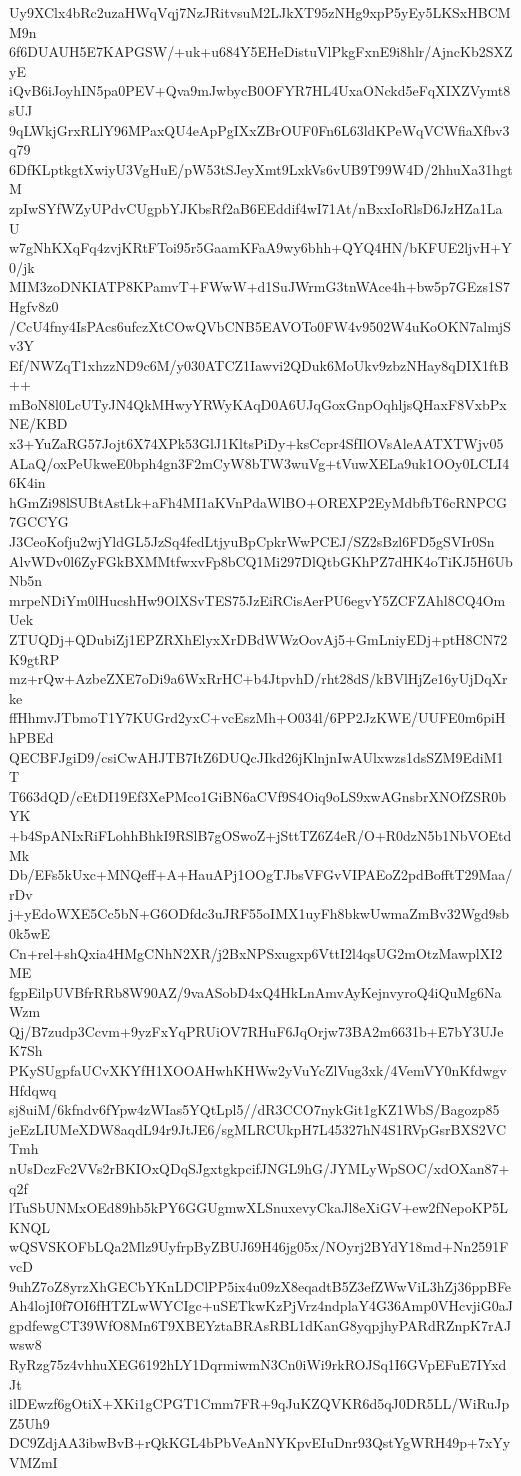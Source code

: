 Uy9XClx4bRc2uzaHWqVqj7NzJRitvsuM2LJkXT95zNHg9xpP5yEy5LKSxHBCMM9n
6f6DUAUH5E7KAPGSW/+uk+u684Y5EHeDistuVlPkgFxnE9i8hlr/AjncKb2SXZyE
iQvB6iJoyhIN5pa0PEV+Qva9mJwbycB0OFYR7HL4UxaONckd5eFqXIXZVymt8sUJ
9qLWkjGrxRLlY96MPaxQU4eApPgIXxZBrOUF0Fn6L63ldKPeWqVCWfiaXfbv3q79
6DfKLptkgtXwiyU3VgHuE/pW53tSJeyXmt9LxkVs6vUB9T99W4D/2hhuXa31hgtM
zpIwSYfWZyUPdvCUgpbYJKbsRf2aB6EEddif4wI71At/nBxxIoRlsD6JzHZa1LaU
w7gNhKXqFq4zvjKRtFToi95r5GaamKFaA9wy6bhh+QYQ4HN/bKFUE2ljvH+Y0/jk
MIM3zoDNKIATP8KPamvT+FWwW+d1SuJWrmG3tnWAce4h+bw5p7GEzs1S7Hgfv8z0
/CcU4fny4IsPAcs6ufczXtCOwQVbCNB5EAVOTo0FW4v9502W4uKoOKN7almjSv3Y
Ef/NWZqT1xhzzND9c6M/y030ATCZ1Iawvi2QDuk6MoUkv9zbzNHay8qDIX1ftB++
mBoN8l0LcUTyJN4QkMHwyYRWyKAqD0A6UJqGoxGnpOqhljsQHaxF8VxbPxNE/KBD
x3+YuZaRG57Jojt6X74XPk53GlJ1KltsPiDy+ksCcpr4SfIlOVsAleAATXTWjv05
ALaQ/oxPeUkweE0bph4gn3F2mCyW8bTW3wuVg+tVuwXELa9uk1OOy0LCLI46K4in
hGmZi98lSUBtAstLk+aFh4MI1aKVnPdaWlBO+OREXP2EyMdbfbT6cRNPCG7GCCYG
J3CeoKofju2wjYldGL5JzSq4fedLtjyuBpCpkrWwPCEJ/SZ2sBzl6FD5gSVIr0Sn
AlvWDv0l6ZyFGkBXMMtfwxvFp8bCQ1Mi297DlQtbGKhPZ7dHK4oTiKJ5H6UbNb5n
mrpeNDiYm0lHucshHw9OlXSvTES75JzEiRCisAerPU6egvY5ZCFZAhl8CQ4OmUek
ZTUQDj+QDubiZj1EPZRXhElyxXrDBdWWzOovAj5+GmLniyEDj+ptH8CN72K9gtRP
mz+rQw+AzbeZXE7oDi9a6WxRrHC+b4JtpvhD/rht28dS/kBVlHjZe16yUjDqXrke
ffHhmvJTbmoT1Y7KUGrd2yxC+vcEszMh+O034l/6PP2JzKWE/UUFE0m6piHhPBEd
QECBFJgiD9/csiCwAHJTB7ItZ6DUQcJIkd26jKlnjnIwAUlxwzs1dsSZM9EdiM1T
T663dQD/cEtDI19Ef3XePMco1GiBN6aCVf9S4Oiq9oLS9xwAGnsbrXNOfZSR0bYK
+b4SpANIxRiFLohhBhkI9RSlB7gOSwoZ+jSttTZ6Z4eR/O+R0dzN5b1NbVOEtdMk
Db/EFs5kUxc+MNQeff+A+HauAPj1OOgTJbsVFGvVIPAEoZ2pdBofftT29Maa/rDv
j+yEdoWXE5Cc5bN+G6ODfdc3uJRF55oIMX1uyFh8bkwUwmaZmBv32Wgd9sb0k5wE
Cn+rel+shQxia4HMgCNhN2XR/j2BxNPSxugxp6VttI2l4qsUG2mOtzMawplXI2ME
fgpEilpUVBfrRRb8W90AZ/9vaASobD4xQ4HkLnAmvAyKejnvyroQ4iQuMg6NaWzm
Qj/B7zudp3Ccvm+9yzFxYqPRUiOV7RHuF6JqOrjw73BA2m6631b+E7bY3UJeK7Sh
PKySUgpfaUCvXKYfH1XOOAHwhKHWw2yVuYcZlVug3xk/4VemVY0nKfdwgvHfdqwq
sj8uiM/6kfndv6fYpw4zWIas5YQtLpl5//dR3CCO7nykGit1gKZ1WbS/Bagozp85
jeEzLIUMeXDW8aqdL94r9JtJE6/sgMLRCUkpH7L45327hN4S1RVpGsrBXS2VCTmh
nUsDczFc2VVs2rBKIOxQDqSJgxtgkpcifJNGL9hG/JYMLyWpSOC/xdOXan87+q2f
lTuSbUNMxOEd89hb5kPY6GGUgmwXLSnuxevyCkaJl8eXiGV+ew2fNepoKP5LKNQL
wQSVSKOFbLQa2Mlz9UyfrpByZBUJ69H46jg05x/NOyrj2BYdY18md+Nn2591FvcD
9uhZ7oZ8yrzXhGECbYKnLDClPP5ix4u09zX8eqadtB5Z3efZWwViL3hZj36ppBFe
Ah4lojI0f7OI6fHTZLwWYCIgc+uSETkwKzPjVrz4ndplaY4G36Amp0VHcvjiG0aJ
gpdfewgCT39WfO8Mn6T9XBEYztaBRAsRBL1dKanG8yqpjhyPARdRZnpK7rAJwsw8
RyRzg75z4vhhuXEG6192hLY1DqrmiwmN3Cn0iWi9rkROJSq1I6GVpEFuE7IYxdJt
ilDEwzf6gOtiX+XKi1gCPGT1Cmm7FR+9qJuKZQVKR6d5qJ0DR5LL/WiRuJpZ5Uh9
DC9ZdjAA3ibwBvB+rQkKGL4bPbVeAnNYKpvEIuDnr93QstYgWRH49p+7xYyVMZmI
